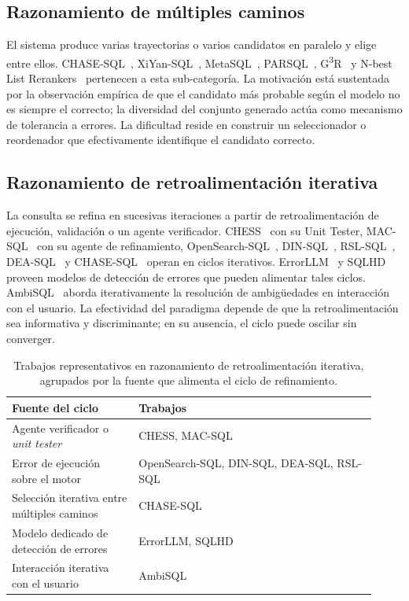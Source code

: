\subsection{Razonamiento de múltiples caminos}
\label{subsec:sota-d5-multipath}

El sistema produce varias trayectorias o varios candidatos en paralelo y
elige entre ellos. CHASE-SQL~\cite{CHASE-SQL2025},
XiYan-SQL~\cite{XiYan-SQL2024}, MetaSQL~\cite{MetaSQL2024},
PARSQL~\cite{PARSQL2025}, G\textsuperscript{3}R~\cite{G3R2023} y
N-best List Rerankers~\cite{N-bestListRerankers2022} pertenecen a esta
sub-categoría. La motivación está sustentada por la observación
empírica de que el candidato más probable según el modelo no es
siempre el correcto; la diversidad del conjunto generado actúa como
mecanismo de tolerancia a errores. La dificultad reside en construir un
seleccionador o reordenador que efectivamente identifique el candidato
correcto.

\subsection{Razonamiento de retroalimentación iterativa}
\label{subsec:sota-d5-iterativo}

La consulta se refina en sucesivas iteraciones a partir de
retroalimentación de ejecución, validación o un agente verificador.
CHESS~\cite{CHESS2024} con su Unit Tester, MAC-SQL~\cite{MAC-SQL2023}
con su agente de refinamiento, OpenSearch-SQL~\cite{OpenSearch-SQL2025},
DIN-SQL~\cite{DIN-SQL2023}, RSL-SQL~\cite{RSL-SQL2024},
DEA-SQL~\cite{DEA-SQL2024} y CHASE-SQL~\cite{CHASE-SQL2025} operan en
ciclos iterativos. ErrorLLM~\cite{errorllm2026} y SQLHD~\cite{SQLHD2025}
proveen modelos de detección de errores que pueden alimentar tales
ciclos. AmbiSQL~\cite{AmbiSQL} aborda iterativamente la resolución de
ambigüedades en interacción con el usuario. La efectividad del
paradigma depende de que la retroalimentación sea informativa y
discriminante; en su ausencia, el ciclo puede oscilar sin converger.

\begin{table}[!htbp]
\centering
\footnotesize
\caption{Trabajos representativos en razonamiento de retroalimentación iterativa, agrupados por la fuente que alimenta el ciclo de refinamiento.}
\label{tab:sota-d5-iterativo}
\begin{tabular}{@{}p{0.32\linewidth}p{0.60\linewidth}@{}}
\toprule
\textbf{Fuente del ciclo} & \textbf{Trabajos} \\
\midrule
Agente verificador o \emph{unit tester} & CHESS, MAC-SQL \\
Error de ejecución sobre el motor & OpenSearch-SQL, DIN-SQL, DEA-SQL, RSL-SQL \\
Selección iterativa entre múltiples caminos & CHASE-SQL \\
Modelo dedicado de detección de errores & ErrorLLM, SQLHD \\
Interacción iterativa con el usuario & AmbiSQL \\
\bottomrule
\end{tabular}
\end{table}

